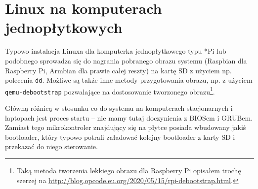 % 
% 
% 
% 

\ifdefined\mysection
	\def\useExternalSection{TRUE}
\else
	\newcommand\mysection[1]{\section{#1}}
\fi

\mysection{Linux na komputerach jednopłytkowych}

Typowo instalacja Linuxa dla komputerka jednopłytkowego typu *Pi lub podobnego sprowadza się do nagrania pobranego obrazu systemu (Raspbian dla Raspberry Pi, Armbian dla prawie całej reszty) na kartę SD z użyciem np. polecenia \Verb$dd$.
Możliwe są także inne metody przygotowania obrazu, np. z użyciem \Verb$qemu-debootstrap$ pozwalające na dostosowanie tworzonego obrazu\footnote{Taką metoda tworzenia lekkiego obrazu dla Raspberry Pi opisałem trochę szerzej na \url{http://blog.opcode.eu.org/2020/05/15/rpi-debootstrap.html}.}.

\vspace{7pt}

Główną różnicą w stosunku co do systemu na komputerach stacjonarnych i laptopach jest proces startu – nie mamy tutaj doczynienia z BIOSem i GRUBem.
Zamiast tego mikrokontroler znajdujący się na płytce posiada wbudowany jakiś bootloader, który typowo potrafi załadować kolejny bootloader z karty SD i przekazać do niego sterowanie.


